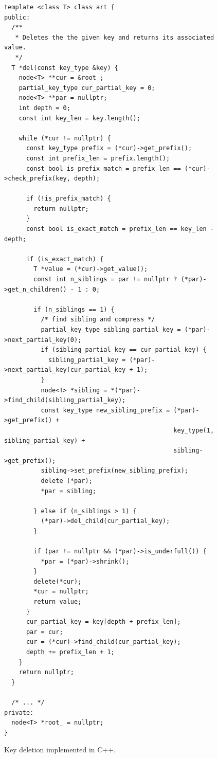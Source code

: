 \documentclass[abstracton,12pt]{scrartcl}
\theoremstyle{definition}
\begin{document}
\begin{figure}[H]
  \begin{verbatim}
template <class T> class art {
public:
  /**
   * Deletes the the given key and returns its associated value.
   */
  T *del(const key_type &key) {
    node<T> **cur = &root_;
    partial_key_type cur_partial_key = 0;
    node<T> **par = nullptr;
    int depth = 0;
    const int key_len = key.length();

    while (*cur != nullptr) {
      const key_type prefix = (*cur)->get_prefix();
      const int prefix_len = prefix.length();
      const bool is_prefix_match = prefix_len == (*cur)->check_prefix(key, depth);

      if (!is_prefix_match) {
        return nullptr;
      }
      const bool is_exact_match = prefix_len == key_len - depth;

      if (is_exact_match) {
        T *value = (*cur)->get_value();
        const int n_siblings = par != nullptr ? (*par)->get_n_children() - 1 : 0;

        if (n_siblings == 1) {
          /* find sibling and compress */
          partial_key_type sibling_partial_key = (*par)->next_partial_key(0);
          if (sibling_partial_key == cur_partial_key) {
            sibling_partial_key = (*par)->next_partial_key(cur_partial_key + 1);
          }
          node<T> *sibling = *(*par)->find_child(sibling_partial_key);
          const key_type new_sibling_prefix = (*par)->get_prefix() +
                                              key_type(1, sibling_partial_key) +
                                              sibling->get_prefix();
          sibling->set_prefix(new_sibling_prefix);
          delete (*par);
          *par = sibling;

        } else if (n_siblings > 1) {
          (*par)->del_child(cur_partial_key);
        } 

        if (par != nullptr && (*par)->is_underfull()) {
          *par = (*par)->shrink();
        }
        delete(*cur);
        *cur = nullptr;
        return value;
      }
      cur_partial_key = key[depth + prefix_len];
      par = cur;
      cur = (*cur)->find_child(cur_partial_key);
      depth += prefix_len + 1;
    }
    return nullptr;
  }

  /* ... */
private:
  node<T> *root_ = nullptr;
}
  \end{verbatim}
  \caption{Key deletion implemented in C++.}
  \label{algo:deletion}
\end{figure}
\end{document}
